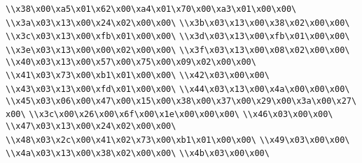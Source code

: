\verb|\\x38\x00\xa5\x01\x62\x00\xa4\x01\x70\x00\xa3\x01\x00\x00\|\newline
\verb|\\x3a\x03\x13\x00\x24\x02\x00\x00\|\newline
\verb|\\x3b\x03\x13\x00\x38\x02\x00\x00\|\newline
\verb|\\x3c\x03\x13\x00\xfb\x01\x00\x00\|\newline
\verb|\\x3d\x03\x13\x00\xfb\x01\x00\x00\|\newline
\verb|\\x3e\x03\x13\x00\x00\x02\x00\x00\|\newline
\verb|\\x3f\x03\x13\x00\x08\x02\x00\x00\|\newline
\verb|\\x40\x03\x13\x00\x57\x00\x75\x00\x09\x02\x00\x00\|\newline
\verb|\\x41\x03\x73\x00\xb1\x01\x00\x00\|\newline
\verb|\\x42\x03\x00\x00\|\newline
\verb|\\x43\x03\x13\x00\xfd\x01\x00\x00\|\newline
\verb|\\x44\x03\x13\x00\x4a\x00\x00\x00\|\newline
\verb|\\x45\x03\x06\x00\x47\x00\x15\x00\x38\x00\x37\x00\x29\x00\x3a\x00\x27\x00\|\newline
\verb|\\x3c\x00\x26\x00\x6f\x00\x1e\x00\x00\x00\|\newline
\verb|\\x46\x03\x00\x00\|\newline
\verb|\\x47\x03\x13\x00\x24\x02\x00\x00\|\newline
\verb|\\x48\x03\x2c\x00\x41\x02\x73\x00\xb1\x01\x00\x00\|\newline
\verb|\\x49\x03\x00\x00\|\newline
\verb|\\x4a\x03\x13\x00\x38\x02\x00\x00\|\newline
\verb|\\x4b\x03\x00\x00\|\newline
